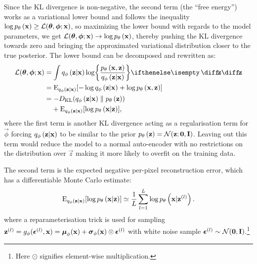 Since the KL divergence is non-negative, the second term (the ``free energy'') works as a variational lower bound and follows the inequality $\log p_{\theta}\left(\bm{\mathrm{x}}\right) \ge \mathcal{L}(\bm{\mathrm{\theta}},\bm{\mathrm{\phi}};\bm{\mathrm{x}})$, so maximizing the lower bound with regards to the model parameters, we get $\mathcal{L}(\bm{\mathrm{\theta}},\bm{\mathrm{\phi}};\bm{\mathrm{x}})\rightarrow \log p_{\theta}\left(\bm{\mathrm{x}}\right)$, thereby pushing the KL divergence towards zero and bringing the approximated variational distribution closer to the true posterior.
The lower bound can be decomposed and rewritten as:
\begin{gather}
	\begin{split}
		\mathcal{L}\parens{\vec{\theta},\vec{\phi};\vec{x}} 
		& = \int \enc{\vec{z}|\vec{x}} \log \curlies*{ \frac{\dec{\vec{x},\vec{z}}}{\enc{\vec{z}|\vec{x}} } } \D{\vec{z}} \\
		& = \E_{\enc{\vec{z}|\vec{x}}} \brackets{- \log \enc{\vec{z}|\vec{x}} + \log \dec{\vec{x},\vec{z}} } 
		\\
		& = -D\idx{KL}\parens{ \enc{\vec{z}|\vec{x}} \parallel \dec{\vec{z}} }
        \\ & \hphantom{{}=}
        + \E_{\enc{\vec{z}|\vec{x}}} \brackets{\log \dec{\vec{x}|\vec{z}} } ,	
	\end{split}
\end{gather}
where the first term is another KL divergence acting as a regularisation term for $\vec{\phi}$ forcing $q_{\phi}\left(\bm{\mathrm{z}}|\bm{\mathrm{x}}\right)$ to be similar to the prior $p_{\theta}\left(\bm{\mathrm{z}}\right) = \mathcal{N}(\bm{\mathrm{z}}; \bm{\mathrm{0}},\bm{\mathrm{I}})$. Leaving out this term would reduce the model to a normal auto-encoder with no restrictions on the distribution over $\vec{z}$ making it more likely to overfit on the training data.

The second term is the expected negative per-pixel reconstruction error, which has a differentiable Monte Carlo estimate:
\begin{equation}
	\operatorname{E}_{q_{\phi}\left(\bm{\mathrm{z}}|\bm{\mathrm{x}}\right)} [\log p_{\theta}\left(\bm{\mathrm{x}}|\bm{\mathrm{z}}\right) ] \simeq \frac{1}{L}\sum^L_{l=1} \log p_{\theta}\left(\bm{\mathrm{x}}|\bm{\mathrm{z}}^{(l)}\right).
\end{equation}
where a reparameterisation trick is used for sampling $\bm{\mathrm{z}}^{(l)}= g_\phi (\bm{\mathrm{\epsilon}}^{(l)}, \bm{\mathrm{x}})= \bm{\mathrm{\mu}}_\phi(\bm{\mathrm{x}}) + \bm{\mathrm{\sigma}}_\phi(\bm{\mathrm{x}}) \odot \bm{\mathrm{\epsilon}}^{(l)}$ with white noise sample $\bm{\mathrm{\epsilon}}^{(l)} \sim \mathcal{N}(\bm{\mathrm{0}},\bm{\mathrm{I}})$.\footnote{Here $\odot$ signifies element-wise
multiplication.}

